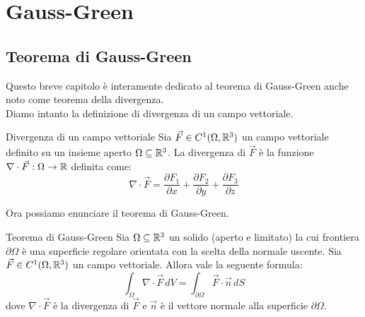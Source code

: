 \chapter{Gauss-Green}
\section{Teorema di Gauss-Green}
Questo breve capitolo è interamente dedicato al teorema di Gauss-Green anche noto come teorema della divergenza.\\
Diamo intanto la definizione di divergenza di un campo vettoriale.
\begin{definizione}{Divergenza di un campo vettoriale}
  Sia $\vec{F} \in C^1(\Omega, \mathbb{R}^3)$ un campo vettoriale definito su un insieme aperto $\Omega \subseteq \mathbb{R}^3$. La divergenza di $\vec{F}$ è la funzione $\nabla \cdot \vec{F} : \Omega \to \mathbb{R}$ definita come:
  $$
    \nabla \cdot \vec{F} = \frac{\partial F_1}{\partial x} + \frac{\partial F_2}{\partial y} + \frac{\partial F_3}{\partial z}
  $$
\end{definizione}
Ora possiamo enunciare il teorema di Gauss-Green.
\begin{teorema}{Teorema di Gauss-Green}
 Sia $\Omega \subseteq \mathbb{R}^3$ un solido (aperto e limitato) la cui frontiera $\partial \Omega$ è una superficie regolare orientata con la scelta della normale uscente. Sia $\vec{F} \in C^1(\Omega, \mathbb{R}^3)$ un campo vettoriale. Allora vale la seguente formula:
  $$
    \int_{\Omega} \nabla \cdot \vec{F} \, dV = \int_{\partial \Omega} \vec{F} \cdot \vec{n} \, dS$$
  dove $\nabla \cdot \vec{F}$ è la divergenza di $\vec{F}$ e $\vec{n}$ è il vettore normale alla superficie $\partial \Omega$.
\end{teorema}

